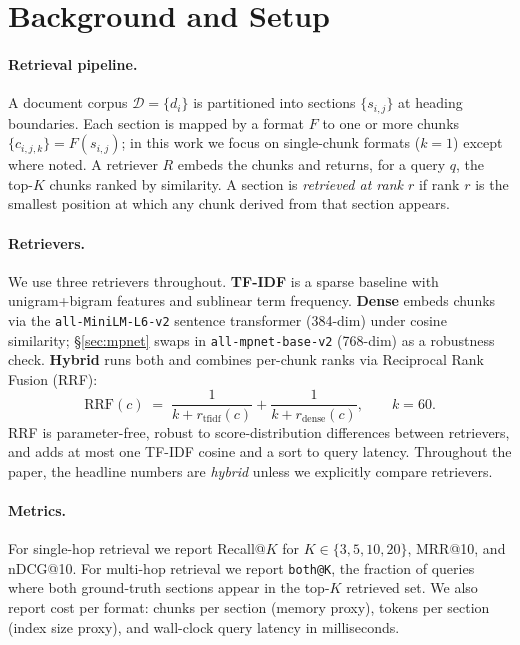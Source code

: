 \documentclass[11pt]{article}
\begin{document}
\section{Background and Setup}

\paragraph{Retrieval pipeline.}
A document corpus $\mathcal{D} = \{d_i\}$ is partitioned into sections
$\{s_{i,j}\}$ at heading boundaries. Each section is mapped by a format
$F$ to one or more chunks $\{c_{i,j,k}\} = F(s_{i,j})$; in this work we
focus on single-chunk formats ($k = 1$) except where noted. A retriever
$R$ embeds the chunks and returns, for a query $q$, the top-$K$ chunks
ranked by similarity. A section is \emph{retrieved at rank $r$} if rank
$r$ is the smallest position at which any chunk derived from that
section appears.

\paragraph{Retrievers.}
We use three retrievers throughout. \textbf{TF-IDF} is a sparse baseline
with unigram+bigram features and sublinear term frequency. \textbf{Dense}
embeds chunks via the \texttt{all-MiniLM-L6-v2} sentence transformer
(384-dim) under cosine similarity; \S\ref{sec:mpnet} swaps in
\texttt{all-mpnet-base-v2} (768-dim) as a robustness check. \textbf{Hybrid} runs both and
combines per-chunk ranks via Reciprocal Rank Fusion (RRF):
\[
  \mathrm{RRF}(c) \;=\; \frac{1}{k + r_{\mathrm{tfidf}}(c)} +
                       \frac{1}{k + r_{\mathrm{dense}}(c)},
  \qquad k = 60.
\]
RRF is parameter-free, robust to score-distribution differences between
retrievers, and adds at most one TF-IDF cosine and a sort to query
latency. Throughout the paper, the headline numbers are \emph{hybrid}
unless we explicitly compare retrievers.

\paragraph{Metrics.}
For single-hop retrieval we report Recall@$K$ for $K \in \{3, 5, 10,
20\}$, MRR@10, and nDCG@10. For multi-hop retrieval we report
\texttt{both@K}, the fraction of queries where both ground-truth
sections appear in the top-$K$ retrieved set. We also report cost per
format: chunks per section (memory proxy), tokens per section (index
size proxy), and wall-clock query latency in milliseconds.
\end{document}
